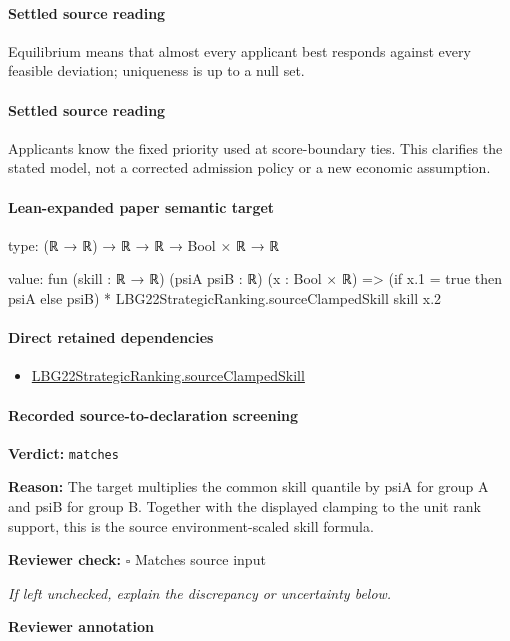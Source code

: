 \documentclass[10pt]{article}
\newcommand{\reviewerbox}{%
  \par\noindent\fbox{\parbox{0.96\linewidth}{\rule{0pt}{0.38in}}}\par
}
\newcommand{\reviewmatch}[1]{%
  \par\noindent\textbf{Reviewer check:} $\square$\; #1\par
  \noindent\emph{If left unchecked, explain the discrepancy or uncertainty below.}\par
}
\begin{document}
\paragraph{Settled source reading}
\begin{sloppypar}
Equilibrium means that almost every applicant best responds against every feasible deviation;\allowbreak{} uniqueness is up to a null set.\allowbreak{}
\end{sloppypar}
\paragraph{Settled source reading}
\begin{sloppypar}
Applicants know the fixed priority used at score-\allowbreak{}boundary ties.\allowbreak{} This clarifies the stated model, not a corrected admission policy or a new economic assumption.\allowbreak{}
\end{sloppypar}

\paragraph{Lean-expanded paper semantic target}
\begin{ReviewVerbatim}
type:
(ℝ → ℝ) → ℝ → ℝ → Bool × ℝ → ℝ

value:
fun (skill : ℝ → ℝ) (psiA psiB : ℝ) (x : Bool × ℝ) =>
  (if x.1 = true then psiA else psiB) * LBG22StrategicRanking.sourceClampedSkill skill x.2
\end{ReviewVerbatim}

\paragraph{Direct retained dependencies}
\begin{itemize}\raggedright
\item \hyperlink{governing-declaration-8658f19612e370c1}{LBG22\allowbreak{}Strategic\allowbreak{}Ranking.\allowbreak{}source\allowbreak{}Clamped\allowbreak{}Skill}
\end{itemize}
\paragraph{Recorded source-to-declaration screening}
\textbf{Verdict:} \texttt{matches}
\\
{\raggedright
\textbf{Reason:} The target multiplies the common skill quantile by psiA for group A and psiB for group B.\allowbreak{} Together with the displayed clamping to the unit rank support, this is the source environment-\allowbreak{}scaled skill formula.\allowbreak{}
\par}
\reviewmatch{Matches source input}
\noindent\textbf{Reviewer annotation}\par
\reviewerbox
\clearpage
\hypertarget{paper-prerequisite-5b3be494cde30a37}{}
\end{document}
